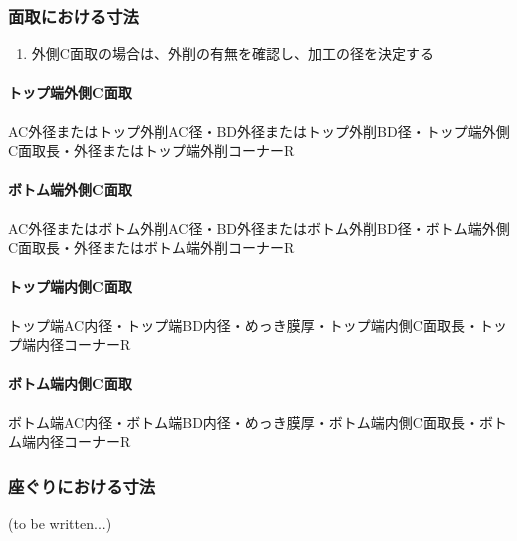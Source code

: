 \subsubsection{面取における寸法}
\begin{enumerate}
\item 外側C面取の場合は、外削の有無を確認し、加工の径を決定する
\end{enumerate}
\begin{Tabbox}[title={必要な図面上のパラメータ}]\small
\paragraph*{トップ端外側C面取}
AC外径またはトップ外削AC径・BD外径またはトップ外削BD径・トップ端外側C面取長・外径またはトップ端外削コーナーR
\tcbline*
\paragraph*{ボトム端外側C面取}
AC外径またはボトム外削AC径・BD外径またはボトム外削BD径・ボトム端外側C面取長・外径またはボトム端外削コーナーR
\tcbline*
\paragraph*{トップ端内側C面取}
トップ端AC内径・トップ端BD内径・めっき膜厚・トップ端内側C面取長・トップ端内径コーナーR
\tcbline*
\paragraph*{ボトム端内側C面取}
ボトム端AC内径・ボトム端BD内径・めっき膜厚・ボトム端内側C面取長・ボトム端内径コーナーR
\end{Tabbox}

\clearpage
\subsubsection{座ぐりにおける寸法\TBW}
(to be written...)


